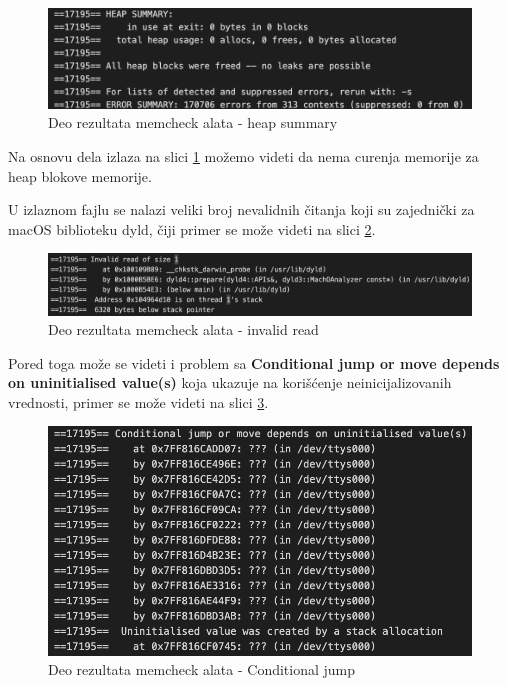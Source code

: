 \documentclass[a4paper]{article}
\begin{document}
\begin{figure}[h!]
\begin{center}
\includegraphics[scale=0.45]{memcheck_01.png}
\end{center}
\caption{Deo rezultata memcheck alata - heap summary}
\label{fig: memcheck-0}
\end{figure}

Na osnovu dela izlaza na slici \ref{fig: memcheck-0} možemo videti da nema curenja memorije za heap blokove memorije. 


U izlaznom fajlu se nalazi veliki broj nevalidnih čitanja koji su zajednički za macOS biblioteku dyld, čiji primer se može videti na slici \ref{fig: memcheck-1}.

\begin{figure}[h!]
\begin{center}
\includegraphics[scale=0.45]{memcheck_02.png}
\end{center}
\caption{Deo rezultata memcheck alata - invalid read}
\label{fig: memcheck-1}
\end{figure}

Pored toga može se videti i problem sa \textbf{Conditional jump or move depends on uninitialised value(s)} koja ukazuje na korišćenje neinicijalizovanih vrednosti, primer se može videti na slici \ref{fig: memcheck-2}.

\begin{figure}[h!]
\begin{center}
\includegraphics[scale=0.45]{memcheck_03.png}
\end{center}
\caption{Deo rezultata memcheck alata - Conditional jump}
\label{fig: memcheck-2}
\end{figure}
\end{document}
